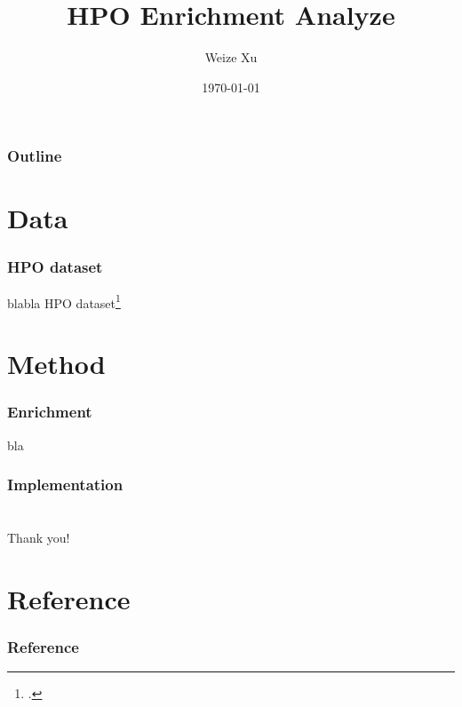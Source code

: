 \documentclass{beamer}
\title{HPO Enrichment Analyze}
\author{Weize Xu}
\institute{Huazhong Agriculture University}
\date{\today}
\begin{document}
\begin{frame}
\titlepage
\end{frame}

\begin{frame}
    \frametitle{Outline}
    \tableofcontents
\end{frame}

\section{Data}

\begin{frame}
    \frametitle{HPO dataset}
    blabla
    HPO dataset\footcite{kohler2018expansion}
\end{frame}

\section{Method}

\begin{frame}
    \frametitle{Enrichment}
    bla
\end{frame}

\begin{frame}
    \frametitle{Implementation}
    
\end{frame}

\section{}

\begin{frame}
    Thank you!
\end{frame}

\section{Reference}
\begin{frame}
    \frametitle{Reference}
    \def\bibfont{\tiny}
    \printbibliography
\end{frame}
\end{document}
